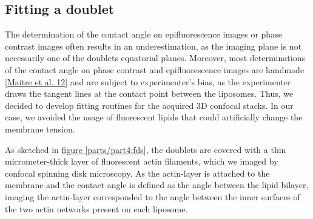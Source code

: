 \documentclass[A4paperpaper,11pt,english]{sphinxmanual}
\begin{document}
\subsection{Fitting a doublet}
\label{parts/part4:fitting-a-doublet}
The determination of the contact angle on epifluorescence images or phase contrast
images often results in an underestimation, as the imaging plane is not necessarily one of the doublets
equatorial planes. Moreover, most determinations of the contact angle on phase
contrast and epifluorescence images are handmade {\hyperref[parts/part4:maitre2012]{{[}Maitre et al. 12{]}}} and
are subject to experimenter’s bias, as the experimenter draws the tangent lines at the
contact point between the liposomes. Thus, we decided to develop fitting routines for the acquired
3D confocal stacks. In our case, we avoided the usage of
fluorescent lipids that could artificially change the membrane tension.

As sketched in \hyperref[parts/part4:fds]{figure  \ref*{parts/part4:fds}}, the doublets are covered with a
thin micrometer-thick layer of fluorescent actin filaments, which we
imaged by confocal spinning disk microscopy. As the actin-layer is attached to the membrane
and the contact angle is defined as the angle between the lipid bilayer, imaging the actin-layer corresponded
to the angle between the inner surfaces of the two actin networks present on each liposome.
\end{document}
